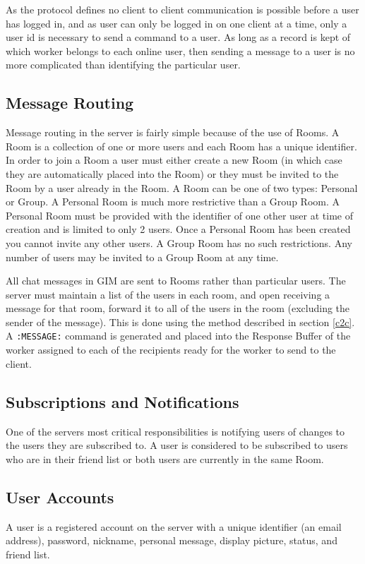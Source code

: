 As the protocol defines no client to client communication is possible before a user has logged in, and as user can only be logged in on one client at a time, only a user id is necessary to send a command to a user. As long as a record is kept of which worker belongs to each online user, then sending a message to a user is no more complicated than identifying the particular user.

\subsection{Message Routing}
\label{message_routing}

Message routing in the server is fairly simple because of the use of Rooms. A Room is a collection of one or more users and each Room has a unique identifier. In order to join a Room a user must either create a new Room (in which case they are automatically placed into the Room) or they must be invited to the Room by a user already in the Room. A Room can be one of two types: Personal or Group. A Personal Room is much more restrictive than a Group Room. A Personal Room must be provided with the identifier of one other user at time of creation and is limited to only 2 users. Once a Personal Room has been created you cannot invite any other users. A Group Room has no such restrictions. Any number of users may be invited to a Group Room at any time.

All chat messages in GIM are sent to Rooms rather than particular users. The server must maintain a list of the users in each room, and open receiving a message for that room, forward it to all of the users in the room (excluding the sender of the message). This is done using the method described in section \ref{c2c}. A \texttt{:MESSAGE:} command is generated and placed into the Response Buffer of the worker assigned to each of the recipients ready for the worker to send to the client.

\subsection{Subscriptions and Notifications}
One of the servers most critical responsibilities is notifying users of changes to the users they are subscribed to. A user is considered to be subscribed to users who are in their friend list or both users are currently in the same Room.

\subsection{User Accounts}
A user is a registered account on the server with a unique identifier (an email address), password, nickname, personal message, display picture, status, and friend list. 

